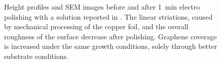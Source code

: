 \begin{figure}\centering
	\qquad 
	\caption{Height profiles and SEM images before and after \SI{1}{\minute} electro polishing with a solution reported in \cite{bin_zhang_low-temperature_2012}. The linear striations, caused by mechanical processing of the copper foil, and the overall roughness of the surface decrease after polishing. Graphene coverage is increased under the same growth conditions, solely through better substrate conditions.}
	\label{fig:}
\end{figure}

